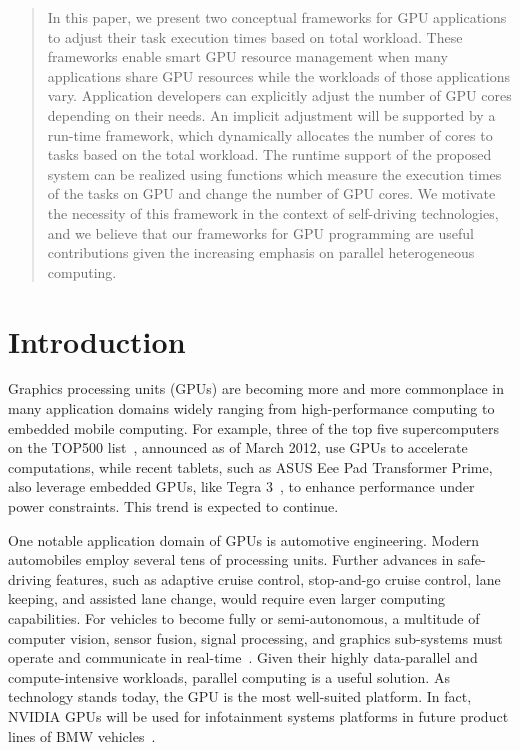 \documentclass{acm_proc_article-sp}
\begin{document}
\begin{abstract}
 In this paper, we present two conceptual frameworks for GPU applications to
 adjust their task execution times based on total workload. These  
 frameworks enable smart GPU resource management when many applications 
 share GPU resources while the workloads of those applications vary. 
 Application 
 developers can explicitly adjust the number of GPU cores depending on their needs. 
 An implicit adjustment will be supported by a run-time framework, which 
 dynamically allocates the number of cores to tasks based on the total 
 workload. The runtime support of the proposed system can be realized using 
 functions which measure the execution times of the tasks on GPU and change 
 the number of GPU cores. We motivate the necessity of this framework 
 in the context of self-driving technologies, and we believe that our 
 frameworks for GPU programming are useful contributions given 
 the increasing emphasis on 
 parallel heterogeneous computing.
\end{abstract}

\section{Introduction}
\label{sec:introduction}

Graphics processing units (GPUs) are becoming more and more commonplace
in many application domains widely ranging from high-performance
computing to embedded mobile computing.
For example, three of the top five supercomputers on the TOP500
list~\cite{TOP500}, announced as of March 2012, use GPUs to accelerate
computations, while recent tablets, such as ASUS Eee Pad Transformer
Prime, also leverage embedded GPUs, like Tegra
3~\cite{Tegra3}, to enhance performance under power constraints.
This trend is expected to continue. 

One notable application domain of GPUs is automotive engineering.
Modern automobiles employ several tens of processing units.
Further advances in safe-driving features, such as adaptive
cruise control, stop-and-go cruise control, lane keeping, and assisted
lane change, would require even larger computing capabilities.
For vehicles to become fully or semi-autonomous, 
a multitude of computer vision,
sensor fusion, signal processing, and graphics sub-systems must operate and
communicate in real-time~\cite{Kelly12, Markoff10, Urmson08}.
Given their highly data-parallel and compute-intensive workloads, 
parallel computing is a useful solution.
As technology stands today, the GPU is the most well-suited platform.
In fact, NVIDIA GPUs will be used for infotainment systems platforms in
future product lines of BMW vehicles~\cite{NVIDIA_BMW}.
\end{document}
